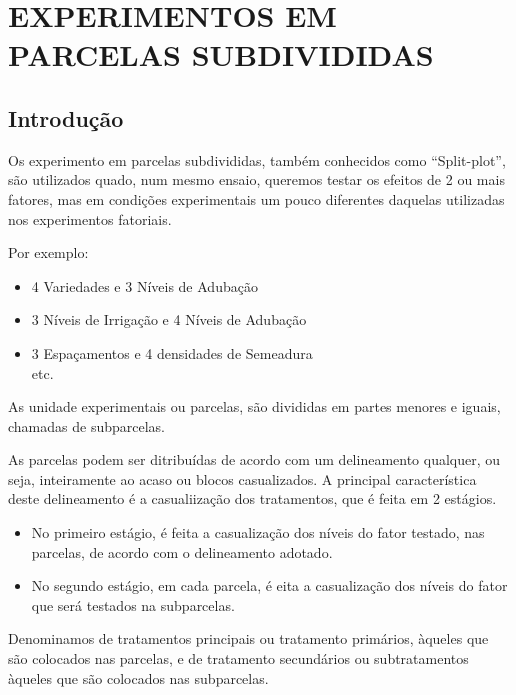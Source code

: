 \documentclass[
]{book}
\providecommand{\tightlist}{%
  \setlength{\itemsep}{0pt}\setlength{\parskip}{0pt}}
\begin{document}
\hypertarget{experimentos-em-parcelas-subdivididas}{%
\chapter{EXPERIMENTOS EM PARCELAS SUBDIVIDIDAS}\label{experimentos-em-parcelas-subdivididas}}

\hypertarget{introduuxe7uxe3o-2}{%
\section{Introdução}\label{introduuxe7uxe3o-2}}

Os experimento em parcelas subdivididas, também conhecidos como ``Split-plot'', são utilizados quado, num mesmo ensaio, queremos testar os efeitos de 2 ou mais fatores, mas em condições experimentais um pouco diferentes daquelas utilizadas nos experimentos fatoriais.

Por exemplo:

\begin{itemize}
\tightlist
\item
  4 Variedades e 3 Níveis de Adubação\\
\item
  3 Níveis de Irrigação e 4 Níveis de Adubação\\
\item
  3 Espaçamentos e 4 densidades de Semeadura\\
  etc.
\end{itemize}

As unidade experimentais ou parcelas, são divididas em partes menores e iguais, chamadas de subparcelas.

As parcelas podem ser ditribuídas de acordo com um delineamento qualquer, ou seja, inteiramente ao acaso ou blocos casualizados. A principal característica deste delineamento é a casualiização dos tratamentos, que é feita em 2 estágios.

\begin{itemize}
\tightlist
\item
  No primeiro estágio, é feita a casualização dos níveis do fator testado, nas parcelas, de acordo com o delineamento adotado.
\item
  No segundo estágio, em cada parcela, é eita a casualização dos níveis do fator que será testados na subparcelas.
\end{itemize}

Denominamos de tratamentos principais ou tratamento primários, àqueles que são colocados nas parcelas, e de tratamento secundários ou subtratamentos àqueles que são colocados nas subparcelas.
\end{document}
